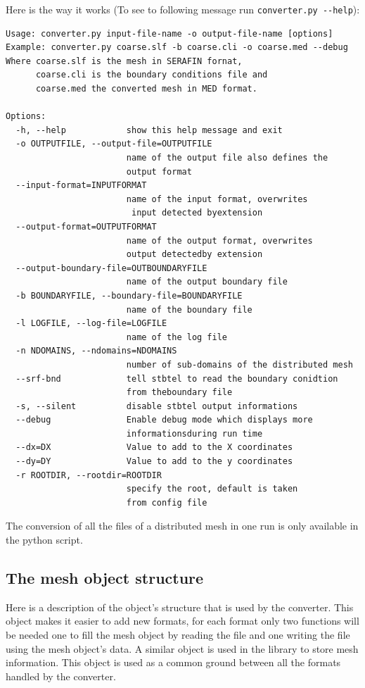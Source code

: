 Here is the way it works (To see to following message run \verb+converter.py --help+):
\begin{verbatim}
Usage: converter.py input-file-name -o output-file-name [options]
Example: converter.py coarse.slf -b coarse.cli -o coarse.med --debug
Where coarse.slf is the mesh in SERAFIN fornat,
      coarse.cli is the boundary conditions file and
      coarse.med the converted mesh in MED format.

Options:
  -h, --help            show this help message and exit
  -o OUTPUTFILE, --output-file=OUTPUTFILE
                        name of the output file also defines the
                        output format
  --input-format=INPUTFORMAT
                        name of the input format, overwrites
                         input detected byextension
  --output-format=OUTPUTFORMAT
                        name of the output format, overwrites
                        output detectedby extension
  --output-boundary-file=OUTBOUNDARYFILE
                        name of the output boundary file
  -b BOUNDARYFILE, --boundary-file=BOUNDARYFILE
                        name of the boundary file
  -l LOGFILE, --log-file=LOGFILE
                        name of the log file
  -n NDOMAINS, --ndomains=NDOMAINS
                        number of sub-domains of the distributed mesh
  --srf-bnd             tell stbtel to read the boundary conidtion
                        from theboundary file
  -s, --silent          disable stbtel output informations
  --debug               Enable debug mode which displays more
                        informationsduring run time
  --dx=DX               Value to add to the X coordinates
  --dy=DY               Value to add to the y coordinates
  -r ROOTDIR, --rootdir=ROOTDIR
                        specify the root, default is taken
                        from config file
\end{verbatim}

The conversion of all the files of a distributed mesh in one run is only
available in the python script.

\subsection{The mesh object structure}

Here is a description of the object's structure that is used by the converter.
This object makes it easier to add new formats, for each format only two
functions will be needed one to fill the mesh object by reading the file and
one writing the file using the mesh object's data.  A similar object is used in
the \bief library to store mesh information.  This object is used as a common
ground between all the formats handled by the converter.

